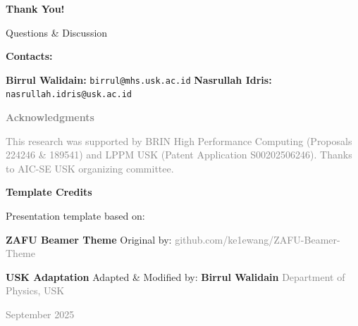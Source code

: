 \documentclass{beamer}
\def\\{}%
\begin{document}
\begin{frame}{}
  \vfill
  \begin{center}
    {\Huge \textcolor{uskGold}{\textbf{Thank You!}}}
    
    \vspace{1em}
    
    {\Large Questions \& Discussion}
    
    \vspace{1.5em}
    
    {\large \textcolor{uskGold}{\textbf{Contacts:}}}
    
    \vspace{0.5em}
    
    {\normalsize 
    \textbf{Birrul Walidain:} \texttt{birrul@mhs.usk.ac.id}\\
    \textbf{Nasrullah Idris:} \texttt{nasrullah.idris@usk.ac.id}
    }
  \end{center}
  \vfill
  
  \begin{center}
    {\footnotesize \textcolor{gray}{\textbf{Acknowledgments}}}
    
    \vspace{0.3em}
    
    {\scriptsize \textcolor{gray}{
    This research was supported by BRIN High Performance Computing\\
    (Proposals 224246 \& 189541) and LPPM USK (Patent Application S00202506246).\\
    Thanks to AIC-SE USK organizing committee.
    }}
  \end{center}
\end{frame}

\begin{frame}{}
  \vfill
  \begin{center}
    {\Large \textcolor{uskGold}{\textbf{Template Credits}}}
    
    \vspace{1.5em}
    
    {\large Presentation template based on:}
    
    \vspace{1em}
    
    {\LARGE \textbf{ZAFU Beamer Theme}}\\
    \vspace{0.5em}
    {\normalsize Original by: \textcolor{gray}{github.com/ke1ewang/ZAFU-Beamer-Theme}}
    
    \vspace{1.5em}
    
    {\large \textcolor{uskGold}{\textbf{USK Adaptation}}}\\
    \vspace{0.5em}
    {\normalsize Adapted \& Modified by: \textbf{Birrul Walidain}}\\
    {\small \textcolor{gray}{Department of Physics, USK}}
    
    \vspace{1em}
    
    {\small \textcolor{gray}{September 2025}}
  \end{center}
  \vfill
\end{frame}
\end{document}
